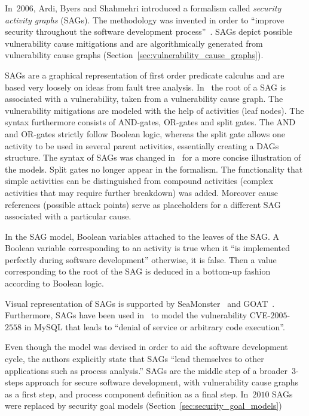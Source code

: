 \documentclass[a4paper]{article}
\begin{document}
In~$2006$, Ardi, Byers and Shahmehri introduced a formalism called
\emph{security activity graphs} (SAGs). The methodology was invented in order to
``improve security throughout the software development process''~\cite{ArBySh}.
SAGs depict possible vulnerability cause mitigations and are algorithmically
generated from vulnerability cause graphs
(Section~\ref{sec:vulnerability_cause_graphs}).

SAGs are a graphical representation of first order predicate calculus and are
based very loosely on ideas from fault tree analysis. In~\cite{ArBySh} the root
of a SAG is associated with a vulnerability, taken from a vulnerability cause
graph. The vulnerability mitigations are modeled with the help of activities
(leaf nodes). The syntax furthermore consists of AND-gates, OR-gates and split
gates. The AND and OR-gates strictly follow Boolean logic, whereas the split
gate allows one activity to be used in several parent activities, essentially
creating a DAGs structure. The syntax of SAGs was changed in~\cite{BySh2} for a
more concise illustration of the models. Split gates no longer appear in the
formalism. The functionality that simple activities can be distinguished from
compound activities (complex activities that may require further breakdown) was
added. Moreover cause references (possible attack points) serve as placeholders
for a different SAG associated with a particular cause.

In the SAG model, Boolean variables attached to the leaves of the SAG. A 
Boolean variable corresponding to an activity is true when it ``is implemented 
perfectly during software development'' otherwise, it is false. Then a value 
corresponding to the root of the SAG is deduced in a bottom-up fashion 
according to Boolean logic.

Visual representation of SAGs is supported by SeaMonster~\cite{MeSpHaBaKrVe} and
GOAT~\cite{GOAT}. Furthermore, SAGs have been used in~\cite{BySh2,BySh3} to 
model the vulnerability CVE-$2005$-$2558$ in MySQL that leads to ``denial of 
service or arbitrary code execution''.

Even though the model was devised in order to aid the software development
cycle, the authors explicitly state that SAGs ``lend themselves to other
applications such as process analysis.'' SAGs are the middle step of a
broader~$3$-steps approach for secure software development, with vulnerability 
cause graphs as a first step, and process component definition as a final step. 
In~$2010$ SAGs were replaced by security goal models 
(Section~\ref{sec:security_goal_models})
\end{document}
